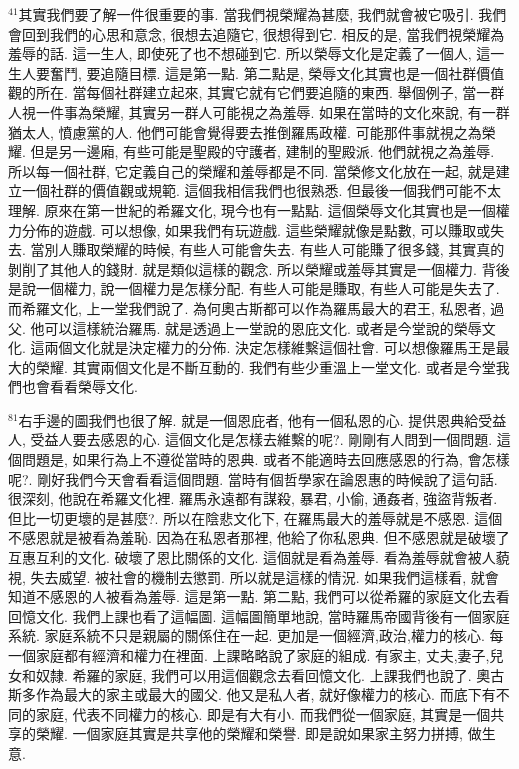 \documentclass{book}
\begin{document}
$^{41}$其實我們要了解一件很重要的事.
當我們視榮耀為甚麼, 我們就會被它吸引.
我們會回到我們的心思和意念, 很想去追隨它, 很想得到它.
相反的是, 當我們視榮耀為羞辱的話.
這一生人, 即使死了也不想碰到它.
所以榮辱文化是定義了一個人, 這一生人要奮鬥, 要追隨目標.
這是第一點.
第二點是, 榮辱文化其實也是一個社群價值觀的所在.
當每個社群建立起來, 其實它就有它們要追隨的東西.
舉個例子, 當一群人視一件事為榮耀, 其實另一群人可能視之為羞辱.
如果在當時的文化來說, 有一群猶太人, 憤慮黨的人.
他們可能會覺得要去推倒羅馬政權.
可能那件事就視之為榮耀.
但是另一邊廂, 有些可能是聖殿的守護者, 建制的聖殿派.
他們就視之為羞辱.
所以每一個社群, 它定義自己的榮耀和羞辱都是不同.
當榮修文化放在一起, 就是建立一個社群的價值觀或規範.
這個我相信我們也很熟悉.
但最後一個我們可能不太理解.
原來在第一世紀的希羅文化, 現今也有一點點.
這個榮辱文化其實也是一個權力分佈的遊戲.
可以想像, 如果我們有玩遊戲.
這些榮耀就像是點數, 可以賺取或失去.
當別人賺取榮耀的時候, 有些人可能會失去.
有些人可能賺了很多錢, 其實真的剝削了其他人的錢財.
就是類似這樣的觀念.
所以榮耀或羞辱其實是一個權力.
背後是說一個權力, 說一個權力是怎樣分配.
有些人可能是賺取, 有些人可能是失去了.
而希羅文化, 上一堂我們說了.
為何奧古斯都可以作為羅馬最大的君王, 私恩者, 過父.
他可以這樣統治羅馬.
就是透過上一堂說的恩庇文化.
或者是今堂說的榮辱文化.
這兩個文化就是決定權力的分佈.
決定怎樣維繫這個社會.
可以想像羅馬王是最大的榮耀.
其實兩個文化是不斷互動的.
我們有些少重溫上一堂文化.
或者是今堂我們也會看看榮辱文化.

$^{81}$右手邊的圖我們也很了解.
就是一個恩庇者, 他有一個私恩的心.
提供恩典給受益人, 受益人要去感恩的心.
這個文化是怎樣去維繫的呢?.
剛剛有人問到一個問題.
這個問題是, 如果行為上不遵從當時的恩典.
或者不能適時去回應感恩的行為, 會怎樣呢?.
剛好我們今天會看看這個問題.
當時有個哲學家在論恩惠的時候說了這句話.
很深刻, 他說在希羅文化裡.
羅馬永遠都有謀殺, 暴君, 小偷, 通姦者, 強盜背叛者.
但比一切更壞的是甚麼?.
所以在陰悲文化下, 在羅馬最大的羞辱就是不感恩.
這個不感恩就是被看為羞恥.
因為在私恩者那裡, 他給了你私恩典.
但不感恩就是破壞了互惠互利的文化.
破壞了恩比關係的文化.
這個就是看為羞辱.
看為羞辱就會被人藐視, 失去威望.
被社會的機制去懲罰.
所以就是這樣的情況.
如果我們這樣看, 就會知道不感恩的人被看為羞辱.
這是第一點.
第二點, 我們可以從希羅的家庭文化去看回憶文化.
我們上課也看了這幅圖.
這幅圖簡單地說, 當時羅馬帝國背後有一個家庭系統.
家庭系統不只是親屬的關係住在一起.
更加是一個經濟,政治,權力的核心.
每一個家庭都有經濟和權力在裡面.
上課略略說了家庭的組成.
有家主, 丈夫,妻子,兒女和奴隸.
希羅的家庭, 我們可以用這個觀念去看回憶文化.
上課我們也說了.
奧古斯多作為最大的家主或最大的國父.
他又是私人者, 就好像權力的核心.
而底下有不同的家庭, 代表不同權力的核心.
即是有大有小.
而我們從一個家庭, 其實是一個共享的榮耀.
一個家庭其實是共享他的榮耀和榮譽.
即是說如果家主努力拼搏, 做生意.
\end{document}
